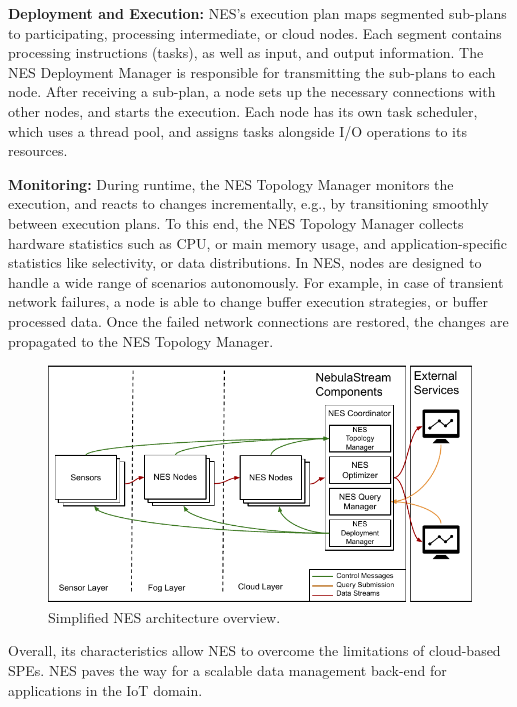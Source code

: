 \textbf{Deployment and Execution:}
NES's execution plan maps segmented sub-plans to participating, processing intermediate, or cloud nodes. 
Each segment contains processing instructions (tasks), as well as input, and output information. The NES Deployment Manager is responsible for transmitting the sub-plans to each node. After receiving a sub-plan, a node sets up the necessary connections with other nodes, and starts the execution. 
Each node has its own task scheduler, which uses a thread pool, and assigns tasks alongside I/O operations to its resources. 

\textbf{Monitoring:}
During runtime, the NES Topology Manager monitors the execution, and reacts to changes incrementally, e.g., by transitioning smoothly between execution plans. 
To this end, the NES Topology Manager collects hardware statistics such as CPU, or main memory usage, and application-specific statistics like selectivity, or data distributions.
In NES, nodes are designed to handle a wide range of scenarios autonomously. 
For example, in case of transient network failures, a node is able to change buffer execution strategies, or buffer processed data. 
Once the failed network connections are restored, the changes are propagated to the NES Topology Manager.
% 
\begin{figure}[h]
  \centering
  \includegraphics[width=\linewidth]{figs/nes_architecture}
  \caption{Simplified NES architecture overview.}
  \label{nes_architecture}
\end{figure}

Overall, its characteristics allow NES to overcome the limitations of cloud-based SPEs. NES paves the way for a scalable data management back-end for applications in the IoT domain.
